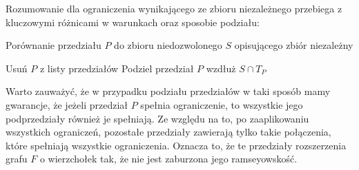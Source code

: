Rozumowanie dla ograniczenia wynikającego ze zbioru niezależnego przebiega z kluczowymi różnicami w warunkach oraz sposobie podziału:

\begin{algorithm}[H]
  \caption{Porównanie przedziału $P$ do zbioru niedozwolonego $S$ opisującego zbiór niezależny}
  \begin{algorithmic}
	  \STATE Usuń $P$ z listy przedziałów
	\ELSE
	  \STATE Podziel przedział $P$ wzdłuż $S \cap T_P  $
  	\ENDIF
  \ENDIF  
  \end{algorithmic}
\end{algorithm}

Warto zauważyć, że w przypadku podziału przedziałów w taki sposób mamy gwarancje, że jeżeli przedział $P$ spełnia ograniczenie, to wszystkie jego podprzedziały również je spełniają. Ze względu na to, po zaaplikowaniu wszystkich ograniczeń, pozostałe przedziały zawierają tylko takie połączenia, które spełniają wszystkie ograniczenia. Oznacza to, że te przedziały rozszerzenia grafu $F$ o wierzchołek tak, że nie jest zaburzona jego ramseyowskość.  
